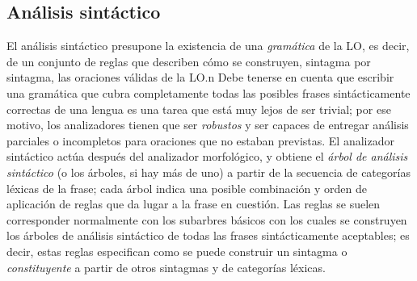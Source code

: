 \subsection{Análisis sintáctico} \label{s3:ansyn} El análisis sintáctico presupone la existencia de una \emph{gramática} de la LO, es decir, de un conjunto de reglas que describen cómo se construyen, sintagma por sintagma, las oraciones válidas de la LO.n Debe tenerse en cuenta que escribir una gramática que cubra completamente todas las posibles frases sintácticamente correctas de una lengua es una tarea que está muy lejos de ser trivial; por ese motivo, los analizadores tienen que ser \emph{robustos} y ser capaces de entregar análisis parciales o incompletos para oraciones que no estaban previstas. El analizador sintáctico actúa después del analizador morfológico, y obtiene el \emph{árbol de análisis sintáctico} (o los árboles, si hay más de uno) a partir de la secuencia de categorías léxicas de la frase; cada árbol indica una posible combinación y orden de aplicación de reglas que da lugar a la frase en cuestión. Las reglas se suelen corresponder normalmente con los subarbres básicos con los cuales se construyen los árboles de análisis sintáctico de todas las frases sintácticamente aceptables; es decir, estas reglas especifican como se puede construir un sintagma o {\em constituyente} a partir de otros sintagmas y de categorías léxicas. 

